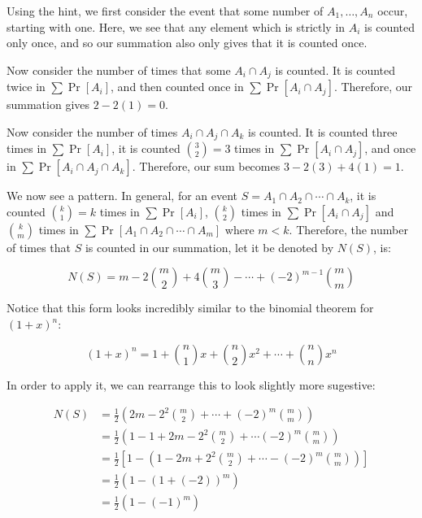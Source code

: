 \documentclass[11pt]{article}
\begin{document}
\begin{solution}
    Using the hint, we first consider the event that some number of $A_1, \dots, A_n$ occur, starting with one. Here, we see that any element which is strictly in $A_i$ is counted only once, and so our summation also only gives that it is counted once. 
    
    Now consider the number of times that some $A_i \cap A_j$ is counted. It is counted twice in $\sum \Pr[A_i]$, and then counted once in $\sum \Pr[A_i \cap A_j]$. Therefore, our summation gives $2 - 2(1) = 0$.
    
    
    Now consider the number of times $A_i \cap A_j \cap A_k$ is counted. It is counted three times in $\sum \Pr[A_i]$, it is counted ${3 \choose 2} = 3$ times in $\sum \Pr[A_i \cap A_j]$, and once in $\sum \Pr[A_i \cap A_j \cap A_k]$. Therefore, our sum becomes $3 - 2(3) + 4(1) = 1$. 

    We now see a pattern. In general, for an event $S = A_1 \cap A_2 \cap \cdots \cap A_k$, it is counted ${k \choose 1} = k$ times in $\sum \Pr[A_i]$, $k \choose 2$ times in $\sum \Pr[A_i \cap A_j]$ and $k \choose m$ times in $\sum \Pr[A_1 \cap A_2 \cap \cdots \cap A_m]$ where $m < k$. Therefore, the number of times that $S$ is counted in our summation, let it be denoted by $N(S)$, is: 

    \[N(S) = m - 2{m \choose 2} + 4 {m \choose 3} - \cdots + (-2)^{m - 1} {m \choose m}\]

    Notice that this form looks incredibly similar to the binomial theorem for $(1 + x)^n$: 

    \[ (1 + x)^n = 1 + {n \choose 1} x + {n \choose 2} x^2 + \cdots + {n \choose n}x^n\]

    In order to apply it, we can rearrange this to look slightly more sugestive: 


    \begin{align*}
        N(S) &= \frac{1}{2} \left( 2m - 2^2 {m \choose 2} + \cdots + (-2)^m {m \choose m}\right)\\
        &= \frac{1}{2} \left(1 - 1 + 2m - 2^2 {m \choose 2} + \cdots (-2)^m {m \choose m}\right)\\
        &= \frac{1}{2} \left[ 1 -\left(1 - 2m +2^2 {m \choose 2} + \cdots -(-2)^m {m \choose m}\right)\right]\\
        &= \frac 12 \left( 1 - (1 + (-2))^m\right)\\
        &= \frac 12 (1 - (-1)^m)
    \end{align*}


\end{solution}
\end{document}
